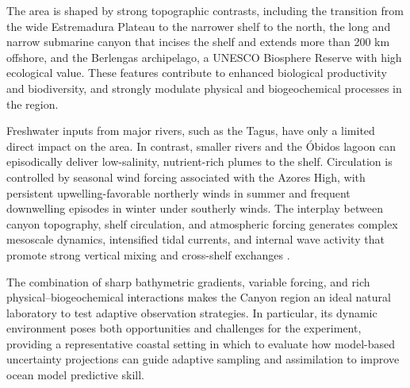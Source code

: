 The \naz area is shaped by strong topographic contrasts, including the
transition from the wide Estremadura Plateau to the narrower shelf to
the north, the long and narrow \naz submarine canyon that incises the
shelf and extends more than 200 km offshore, and the Berlengas
archipelago, a UNESCO Biosphere Reserve with high ecological
value. These features contribute to enhanced biological productivity
and biodiversity, and strongly modulate physical and biogeochemical
processes in the region.

Freshwater inputs from major rivers, such as the Tagus, have only a
limited direct impact on the area. In contrast, smaller rivers and the
\'{O}bidos lagoon can episodically deliver low-salinity, nutrient-rich
plumes to the shelf. Circulation is controlled by seasonal wind forcing
associated with the Azores High, with persistent upwelling-favorable
northerly winds in summer and frequent downwelling episodes in winter
under southerly winds. The interplay between canyon topography, shelf
circulation, and atmospheric forcing generates complex mesoscale
dynamics, intensified tidal currents, and internal wave activity that
promote strong vertical mixing and cross-shelf exchanges
\cite{martins10,quaresma07}.

The combination of sharp bathymetric gradients, variable forcing, and
rich physical–biogeochemical interactions makes the \naz Canyon region
an ideal natural laboratory to test adaptive observation strategies. In
particular, its dynamic environment poses both opportunities and
challenges for the \proj experiment, providing a representative coastal
setting in which to evaluate how model-based uncertainty projections can
guide adaptive sampling and assimilation to improve ocean model
predictive skill.
